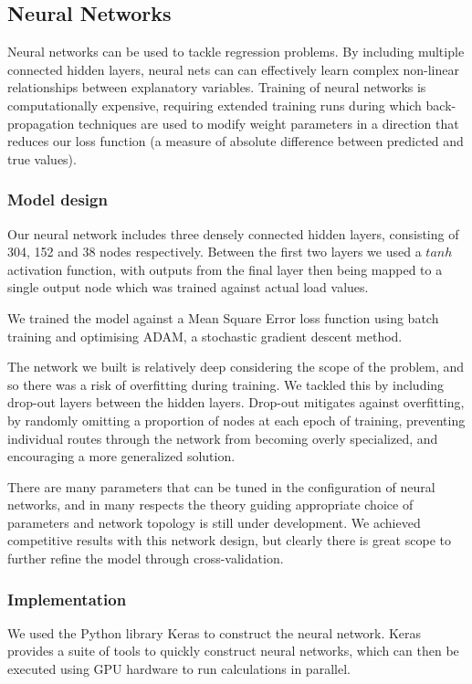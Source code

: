 \documentclass{article} %
\begin{document}
\subsection*{Neural Networks}
Neural networks can be used to tackle regression problems. By including multiple connected hidden layers, neural nets can can effectively learn complex non-linear relationships between explanatory variables.  Training of neural networks is computationally expensive, requiring extended training runs during which back-propagation techniques are used to modify weight parameters in a direction that reduces our loss function (a measure of absolute difference between predicted and true values).

\subsubsection*{Model design}
Our neural network includes three densely connected hidden layers, consisting of 304, 152 and 38 nodes respectively.  Between the first two layers we used a $tanh$ activation function, with outputs from the final layer then being mapped to a single output node which was trained against actual load values.

We trained the model against a Mean Square Error loss function using batch training and optimising ADAM, a stochastic gradient descent method.

The network we built is relatively deep considering the scope of the problem, and so there was a risk of overfitting during training.  We tackled this by including drop-out layers between the hidden layers.  Drop-out mitigates against overfitting, by randomly omitting a proportion of nodes at each epoch of training, preventing individual routes through the network from becoming overly specialized, and encouraging a more generalized solution.

There are many parameters that can be tuned in the configuration of neural networks, and in many respects the theory guiding appropriate choice of parameters and network topology is still under development.  We achieved competitive results with this network design, but clearly there is great scope to further refine the model through cross-validation.

\subsubsection*{Implementation}
We used the Python library Keras to construct the neural network.  Keras provides a suite of tools to quickly construct neural networks, which can then be executed using GPU hardware to run calculations in parallel.
\end{document}
